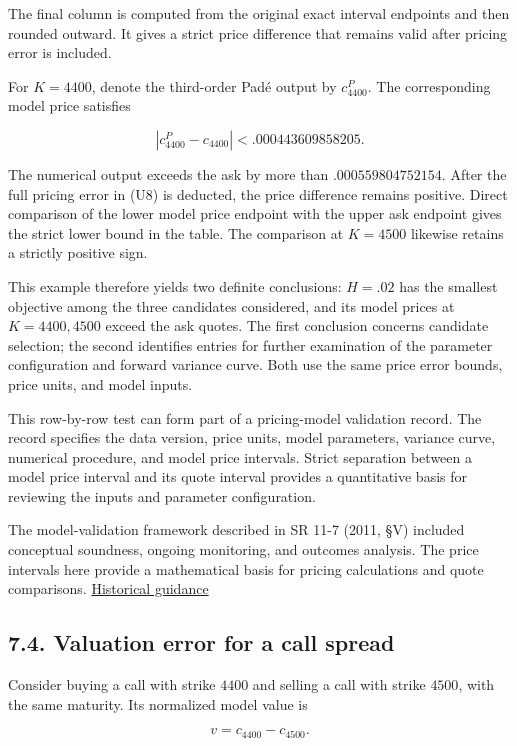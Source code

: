 \documentclass[a4paper,11pt]{article}
\begin{document}
The final column is computed from the original exact interval endpoints and then rounded outward. It gives a strict price difference that remains valid after pricing error is included.

For $K=4400$, denote the third-order Padé output by $c^P_{4400}$. The corresponding model price satisfies

\[
|c^P_{4400}-c_{4400}|
<.000443609858205.
\tag{U8}
\]

The numerical output exceeds the ask by more than $.000559804752154$. After the full pricing error in (U8) is deducted, the price difference remains positive. Direct comparison of the lower model price endpoint with the upper ask endpoint gives the strict lower bound in the table. The comparison at $K=4500$ likewise retains a strictly positive sign.

This example therefore yields two definite conclusions: $H=.02$ has the smallest objective among the three candidates considered, and its model prices at $K=4400,4500$ exceed the ask quotes. The first conclusion concerns candidate selection; the second identifies entries for further examination of the parameter configuration and forward variance curve. Both use the same price error bounds, price units, and model inputs.

This row-by-row test can form part of a pricing-model validation record. The record specifies the data version, price units, model parameters, variance curve, numerical procedure, and model price intervals. Strict separation between a model price interval and its quote interval provides a quantitative basis for reviewing the inputs and parameter configuration.

The model-validation framework described in SR 11-7 (2011, §V) included conceptual soundness, ongoing monitoring, and outcomes analysis. The price intervals here provide a mathematical basis for pricing calculations and quote comparisons. \href{https://www.federalreserve.gov/boarddocs/srletters/2011/sr1107a1.pdf}{Historical guidance}

\subsection*{7.4. Valuation error for a call spread}

Consider buying a call with strike $4400$ and selling a call with strike $4500$, with the same maturity. Its normalized model value is

\[
v=c_{4400}-c_{4500}.
\tag{U9}
\]
\end{document}
